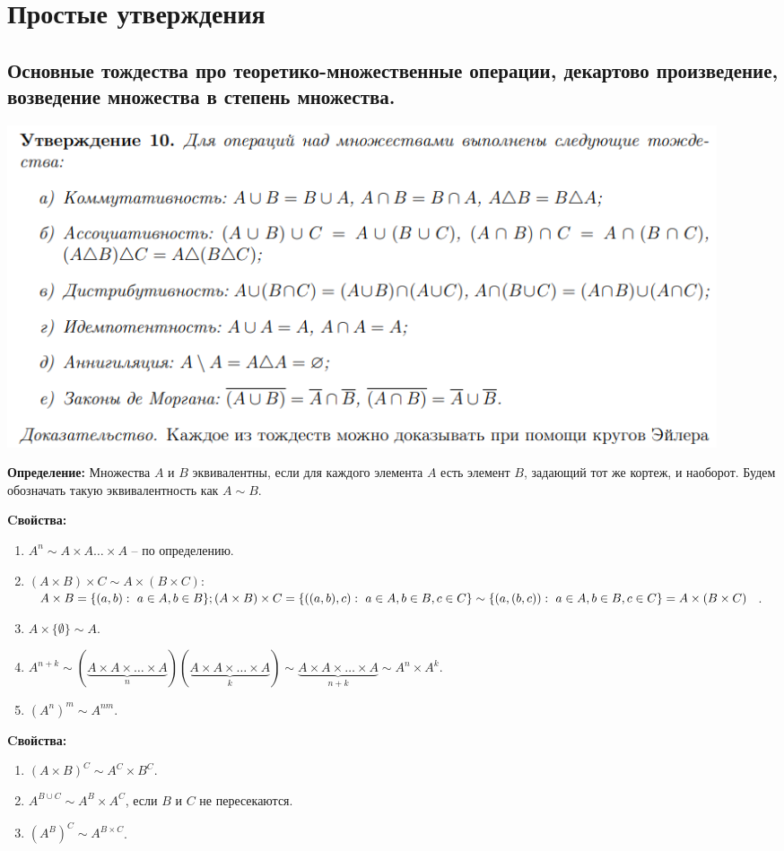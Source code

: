 \section{Простые утверждения}

\subsection{Основные тождества про теоретико-множественные операции, декартово произведение, возведение множества в степень множества.}

\includegraphics[width = 0.92\textwidth]{images/prop_10_sets.png}

\textbf{Определение:} Множества $A$ и $B$ эквивалентны, если для каждого элемента $A$ есть элемент $B$, задающий тот же кортеж, и наоборот. Будем обозначать такую эквивалентность как $A \sim B$.

\textbf{Cвойства:}
\begin{enumerate}
     \item $A^n \sim A\times A\ldots \times A$ -- по определению.
     \item $(A\times B)\times C \sim A \times( B \times C )$:\\
     $A \times B = \{(a,b): \ a \in A, b\in B\}; \\ (A \times B)\times C = \{((a,b),c): \ a \in A, b\in B, c \in C\} \sim \{(a,(b,c)): \ a \in A, b\in B, c \in C\} = A\times (B \times C)$.
     \item $A \times \{\emptyset\} \sim A$.
     \item $A^{n+k} \sim (\underbrace{A\times A \times \ldots \times A}_{n})(\underbrace{A\times A \times \ldots \times A}_{k}) \sim \underbrace{A\times A \times \ldots \times A}_{n+k} \sim A^n \times A^k$.
     \item $(A^n)^m \sim A^{nm}$.
\end{enumerate}

\textbf{Cвойства:}
\begin{enumerate}
    \item $(A \times B)^C \sim A^C \times B^C$.
    \item $A^{B \cup C} \sim A^B \times A^C$, если $B$ и $C$ не пересекаются.
    \item $(A^B)^C \sim A^{B \times C}$.
\end{enumerate}

